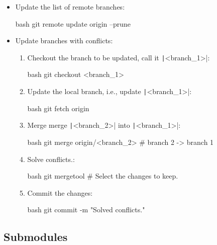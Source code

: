 \begin{itemize}
    \item Update the list of remote branches:
    \begin{mintedbox}{bash}
git remote update origin --prune
    \end{mintedbox}
    \item Update branches with conflicts:
    \begin{enumerate}
        \item Checkout the branch to be updated, call it \texttt|<branch_1>|:
        \begin{mintedbox}{bash}
git checkout <branch_1>
        \end{mintedbox}
        \item Update the local branch, i.e., update \texttt|<branch_1>|:
        \begin{mintedbox}{bash}
git fetch origin
        \end{mintedbox}
        \item Merge merge \texttt|<branch_2>| into \texttt|<branch_1>|:
        \begin{mintedbox}{bash}
git merge origin/<branch_2>  # branch 2 -> branch 1
        \end{mintedbox}
        \item Solve conflicts.:
        \begin{mintedbox}{bash}
git mergetool  # Select the changes to keep.
        \end{mintedbox}
        \item Commit the changes:
        \begin{mintedbox}{bash}
git commit -m "Solved conflicts."
        \end{mintedbox}
    \end{enumerate}
\end{itemize}


\subsection{Submodules}

